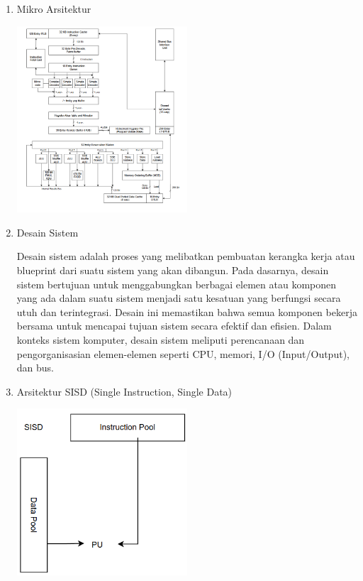 \documentclass[12pt]{article}
\begin{document}
\begin{enumerate}
    
    \item Mikro Arsitektur

        
    \noindent
    \begin{minipage}{\linewidth}
        \centering
        \includegraphics[width=0.5\textwidth]{asset/image4.png} 
    \end{minipage}


    \item Desain Sistem

      Desain sistem adalah proses yang melibatkan pembuatan kerangka kerja atau blueprint dari suatu sistem yang akan dibangun. Pada dasarnya, desain sistem bertujuan untuk menggabungkan berbagai elemen atau komponen yang ada dalam suatu sistem menjadi satu kesatuan yang berfungsi secara utuh dan terintegrasi. Desain ini memastikan bahwa semua komponen bekerja bersama untuk mencapai tujuan sistem secara efektif dan efisien. Dalam konteks sistem komputer, desain sistem meliputi perencanaan dan pengorganisasian elemen-elemen seperti CPU, memori, I/O (Input/Output), dan bus.

      \item Arsitektur SISD (Single Instruction, Single Data)

        \noindent
        \begin{minipage}{\linewidth}
            \centering
            \includegraphics[width=0.5\textwidth]{asset/image6.png} 
        \end{minipage}
      

\end{enumerate}
\end{document}
